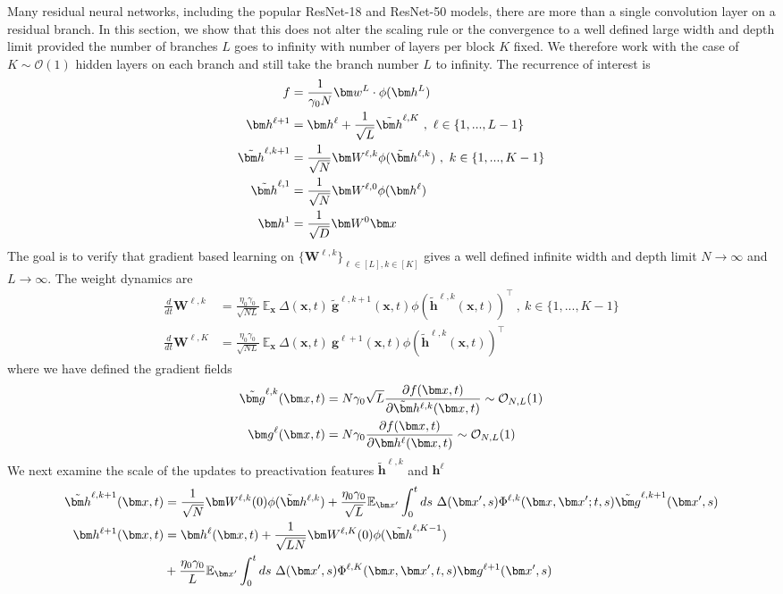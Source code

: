 \documentclass{article} %
\def\h{\bm h}
\def\x{\bm x}
\def\g{\bm g}
\def\w{\bm w}
\def\W{\bm W}
\begin{document}
Many residual neural networks, including the popular ResNet-18 and ResNet-50 models, there are more than a single convolution layer on a residual branch. In this section, we show that this does not alter the scaling rule or the convergence to a well defined large width and depth limit provided the number of branches $L$ goes to infinity with number of layers per block $K$ fixed. We therefore work with the case of $K \sim \mathcal{O}(1)$ hidden layers on each branch and still take the branch number $L$ to infinity. The recurrence of interest is
\begin{align}
    f &= \frac{1}{\gamma_0 N} \w^L \cdot \phi(\h^L) \nonumber 
    \\
    \h^{\ell+1} &= \h^{\ell} + \frac{1}{\sqrt L} \tilde{\h}^{\ell, K} \ , \ \ell \in \{ 1,..., L-1 \} \nonumber
    \\
    \tilde{\h}^{\ell,k+1} &= \frac{1}{\sqrt N} \W^{\ell,k} \phi(\tilde\h^{\ell,k}) \ , \  k \in \{ 1, ... , K-1 \}  \nonumber
    \\ 
    \tilde{\h}^{\ell, 1} &= \frac{1}{\sqrt N} \W^{\ell,0} \phi(\h^\ell) \nonumber
    \\
    \h^1 &= \frac{1}{\sqrt D} \W^0 \x
\end{align}
The goal is to verify that gradient based learning on $\{ \W^{\ell, k} \}_{\ell \in [L], k \in [K]}$ gives a well defined infinite width and depth limit $N \to \infty$ and $L \to \infty$. The weight dynamics are 
\begin{align}
    \frac{d}{dt} \W^{\ell,k} &= \frac{\eta_0 \gamma_0}{\sqrt{N L} } \  \mathbb{E}_{\x} \ \Delta(\x,t) \  \tilde{\g}^{\ell,k+1}(\x,t) \phi\left(\tilde{\h}^{\ell, k}(\x,t) \right)^\top  \ , \ k \in \{1,...,K-1\} \nonumber
    \\
    \frac{d}{dt} \W^{\ell,K} &= \frac{\eta_0 \gamma_0}{\sqrt{N L} } \  \mathbb{E}_{\x} \ \Delta(\x,t) \  {\g}^{\ell+1}(\x,t) \phi\left(\tilde{\h}^{\ell, k}(\x,t) \right)^\top 
\end{align}
where we have defined the gradient fields
\begin{align}
    \tilde{\g}^{\ell, k}(\x,t) &= N \gamma_0 \sqrt{L} \frac{\partial f(\x,t)}{\partial \tilde\h^{\ell,k}(\x,t)} \sim \mathcal{O}_{N,L}(1) \nonumber
    \\
    {\g}^{\ell}(\x,t) &= N \gamma_0  \frac{\partial f(\x,t)}{\partial \h^{\ell}(\x,t)} \sim \mathcal{O}_{N,L}(1) 
\end{align}
We next examine the scale of the updates to preactivation features $\tilde{\h}^{\ell,k}$ and $\h^{\ell}$  
\begin{align}
\tilde{\h}^{\ell,k+1}(\x,t) &= \frac{1}{\sqrt N} \W^{\ell,k}(0) \phi(\tilde\h^{\ell,k}) + \frac{\eta_0 \gamma_0}{\sqrt{L} } \mathbb{E}_{\x'} \int_0^t ds \ \Delta(\x',s) \Phi^{\ell,k}(\x,\x';t,s) \tilde{\g}^{\ell, k+1}(\x',s) \nonumber
\\
\h^{\ell+1}(\x,t) &= \h^{\ell}(\x,t) + \frac{1}{\sqrt{L N}} \W^{\ell,K}(0) \phi(\tilde{\h}^{\ell,K-1}) \nonumber
\\
&+ \frac{\eta_0 \gamma_0}{ L } \mathbb{E}_{\x'} \int_0^t ds  \ \Delta(\x',s) \Phi^{\ell,K}(\x,\x',t,s) \g^{\ell+1}(\x',s)
\end{align}
\end{document}
